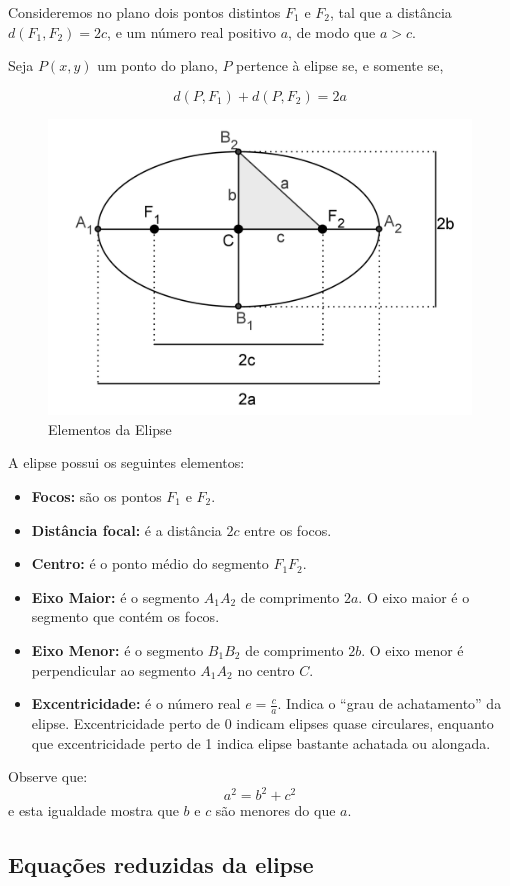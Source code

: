 Consideremos no plano dois pontos distintos $F_1$ e $F_2$, tal que a distância $d(F_1, F_2)=2c$, e um número real positivo $a$, de modo que $a>c$.

Seja $P(x, y)$ um ponto do plano, $P$ pertence à elipse se, e somente se,

$$d(P, F_1)+d(P, F_2)=2a$$


\begin{figure}[H]
\centering
\includegraphics[width=0.45\linewidth]{analitica/imagens/elipse.png}
\caption{Elementos da Elipse}
\label{fig:elipse}
\end{figure}

A elipse possui os seguintes elementos:
\begin{itemize}
  \item \textbf{Focos:} são os pontos $F_1$ e $F_2$.
  \item \textbf{Distância focal:} é a distância $2c$ entre os focos.
  \item \textbf{Centro:} é o ponto médio do segmento $F_1F_2$.
  \item \textbf{Eixo Maior:} é o segmento $A_1A_2$ de comprimento $2a$. O eixo maior é o segmento que contém os focos.
  \item \textbf{Eixo Menor:} é o segmento $B_1B_2$ de comprimento $2b$. O eixo menor é perpendicular ao segmento $A_1A_2$ no centro $C$.
  \item \textbf{Excentricidade:} é o número real $\displaystyle e=\frac{c}{a}$. Indica o ``grau de achatamento'' da elipse. Excentricidade perto de 0 indicam elipses quase circulares, enquanto que excentricidade perto de 1 indica elipse bastante achatada ou alongada.
\end{itemize}

Observe que: $$a^2=b^2+c^2$$ e esta igualdade mostra que $b$ e $c$ são menores do que $a$.

\subsection{Equações reduzidas da elipse}

